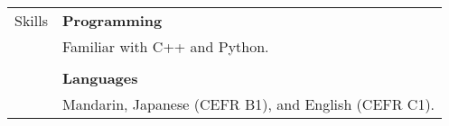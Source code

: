 \documentclass[letterpaper, 11pt]{article}
\begin{document}
\begin{longtable}{p{0.8in}p{5.5in}}


{\textcolor{OliveGreen}{Skills}} 
& \textbf{Programming}\\
& Familiar with C++ and Python. \\
& \\

& \textbf{Languages} \\
& Mandarin, Japanese (CEFR B1), and English (CEFR C1). \\


\end{longtable}
\end{document}
